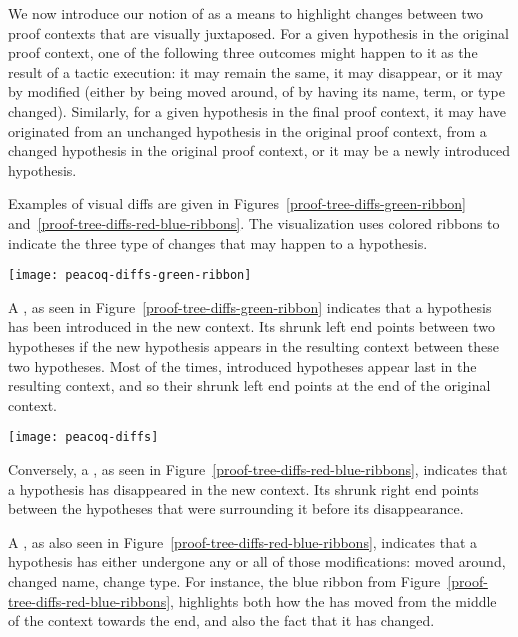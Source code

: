 We now introduce our notion of  as a means to highlight
changes between two proof contexts that are visually juxtaposed.  For a given
hypothesis in the original proof context, one of the following three outcomes
might happen to it as the result of a tactic execution: it may remain the same,
it may disappear, or it may by modified (either by being moved around, of by
having its name, term, or type changed).  Similarly, for a given hypothesis in
the final proof context, it may have originated from an unchanged hypothesis in
the original proof context, from a changed hypothesis in the original proof
context, or it may be a newly introduced hypothesis.

Examples of visual diffs are given in
Figures~\ref{proof-tree-diffs-green-ribbon}
and~\ref{proof-tree-diffs-red-blue-ribbons}.  The visualization uses colored
ribbons to indicate the three type of changes that may happen to a hypothesis.

\begin{figure*}[!htp]
\texttt{[image: peacoq-diffs-green-ribbon]}{\parfillskip=0pt\par}
\caption{Proof-tree visual diff between two obligation nodes (green ribbon)}%
\label{proof-tree-diffs-green-ribbon}
\end{figure*}

A , as seen in
Figure~\ref{proof-tree-diffs-green-ribbon} indicates that a hypothesis has been
introduced in the new context.  Its shrunk left end points between two
hypotheses if the new hypothesis appears in the resulting context between these
two hypotheses.  Most of the times, introduced hypotheses appear last in the
resulting context, and so their shrunk left end points at the end of the
original context.

\begin{figure*}[!htp]
\texttt{[image: peacoq-diffs]}{\parfillskip=0pt\par}
\caption{Proof-tree visual diff between two obligation nodes (red and blue ribbons)}%
\label{proof-tree-diffs-red-blue-ribbons}
\end{figure*}

Conversely, a , as seen in
Figure~\ref{proof-tree-diffs-red-blue-ribbons}, indicates that a hypothesis has
disappeared in the new context.  Its shrunk right end points between the
hypotheses that were surrounding it before its disappearance.

A , as also seen in
Figure~\ref{proof-tree-diffs-red-blue-ribbons}, indicates that a hypothesis has
either undergone any or all of those modifications: moved around, changed name,
change type.  For instance, the blue ribbon from
Figure~\ref{proof-tree-diffs-red-blue-ribbons}, highlights both how the
 has moved from the middle of the context towards the end, and
also the fact that it has changed.

